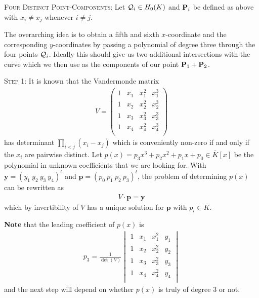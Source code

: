 \documentclass[english,11pt,a4paper]{article}
\begin{document}
\begin{case} {\scshape Four Distinct Point-Components:}
  Let $\q_i \in \enk$ and $\P_i$ be defined as above with $x_i \neq x_j$ whenever $i \neq j$.

  The overarching idea is to obtain a fifth and sixth $x$-coordinate and the corresponding $y$-coordinates by passing a polynomial of degree three through the four points $\q_i$. Ideally this should give us two additional intersections with the curve which we then use as the components of our point $\P_1 + \P_2$.

  {\scshape Step 1:} It is known that the Vandermonde matrix
  \begin{align*}V=
    \begin{pmatrix}
      1 & x_1 & x_1^2 & x_1^3\\
      1 & x_2 & x_2^2 & x_2^3\\
      1 & x_3 & x_3^2 & x_3^3\\
      1 & x_4 & x_4^2 & x_4^3\\
    \end{pmatrix}
  \end{align*}
  has determinant $\prod_{i < j} (x_i-x_j)$ which is conveniently non-zero if and only if the $x_i$ are pairwise distinct. Let $p(x) = p_3 x^3 + p_2 x^2 + p_1 x + p_0 \in \bar K[x]$ be the polynomial in unknown coefficients that we are looking for. With $\textbf{y} = (y_1 \ y_2 \ y_3 \ y_4)^t$ and $\textbf{p} = (p_0 \ p_1 \ p_2 \ p_3)^t$, the problem of determining $p(x)$ can be rewritten as
  \begin{align*}
    V \cdot \mathbf{p} = \mathbf{y}
  \end{align*}
  which by invertibility of $V$ has a unique solution for $\mathbf{p}$ with $p_i\in K$.

  \textbf{Note} that the leading coefficient of $p(x)$ is
  \begin{align*}
    p_3 = \frac{1}{\det (V)}
    \begin{vmatrix}
      1 & x_1 & x_1^2 & y_1\\
      1 & x_2 & x_2^2 & y_2\\
      1 & x_3 & x_3^2 & y_3\\
      1 & x_4 & x_4^2 & y_4\\   
    \end{vmatrix}
  \end{align*}
  and the next step will depend on whether $p(x)$ is truly of degree 3 or not.


\end{case}
\end{document}
